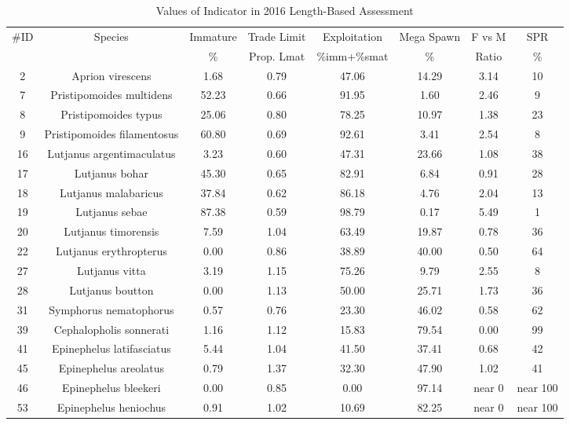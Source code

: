 \documentclass{report}\usepackage[]{graphicx}\usepackage[]{color}
\begin{document}
\begin{table}[ht]
\centering
\caption{Values of Indicator in 2016 Length-Based Assessment} 
{\small
\begin{tabular}{cccccccc}
  \hline
\#ID & Species & Immature & Trade Limit & Exploitation & Mega Spawn & F vs M & SPR \\ 
  {} & {} & {\%} & {Prop. Lmat} & {\%imm+\%smat} & {\%} & {Ratio} & {\%} \\ \hline
  2 & Aprion virescens & 1.68 & 0.79 & 47.06 & 14.29 & 3.14 & 10 \\ 
    7 & Pristipomoides multidens & 52.23 & 0.66 & 91.95 & 1.60 & 2.46 & 9 \\ 
    8 & Pristipomoides typus & 25.06 & 0.80 & 78.25 & 10.97 & 1.38 & 23 \\ 
    9 & Pristipomoides filamentosus & 60.80 & 0.69 & 92.61 & 3.41 & 2.54 & 8 \\ 
   16 & Lutjanus argentimaculatus & 3.23 & 0.60 & 47.31 & 23.66 & 1.08 & 38 \\ 
   17 & Lutjanus bohar & 45.30 & 0.65 & 82.91 & 6.84 & 0.91 & 28 \\ 
   18 & Lutjanus malabaricus & 37.84 & 0.62 & 86.18 & 4.76 & 2.04 & 13 \\ 
   19 & Lutjanus sebae & 87.38 & 0.59 & 98.79 & 0.17 & 5.49 & 1 \\ 
   20 & Lutjanus timorensis & 7.59 & 1.04 & 63.49 & 19.87 & 0.78 & 36 \\ 
   22 & Lutjanus erythropterus & 0.00 & 0.86 & 38.89 & 40.00 & 0.50 & 64 \\ 
   27 & Lutjanus vitta & 3.19 & 1.15 & 75.26 & 9.79 & 2.55 & 8 \\ 
   28 & Lutjanus boutton & 0.00 & 1.13 & 50.00 & 25.71 & 1.73 & 36 \\ 
   31 & Symphorus nematophorus & 0.57 & 0.76 & 23.30 & 46.02 & 0.58 & 62 \\ 
   39 & Cephalopholis sonnerati & 1.16 & 1.12 & 15.83 & 79.54 & 0.00 & 99 \\ 
   41 & Epinephelus latifasciatus & 5.44 & 1.04 & 41.50 & 37.41 & 0.68 & 42 \\ 
   45 & Epinephelus areolatus & 0.79 & 1.37 & 32.30 & 47.90 & 1.02 & 41 \\ 
   46 & Epinephelus bleekeri & 0.00 & 0.85 & 0.00 & 97.14 & near 0 & near 100 \\ 
   53 & Epinephelus heniochus & 0.91 & 1.02 & 10.69 & 82.25 & near 0 & near 100 \\ 

\end{tabular}}
\end{table}
\end{document}
